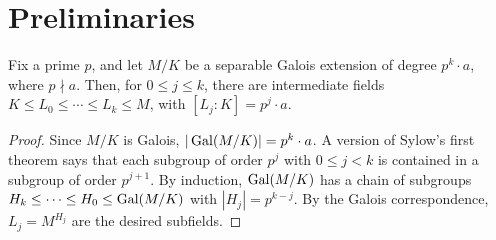 %

\section{Preliminaries}

\begin{lemma}
  \label{lem:sylow_galois}
  Fix a prime $p$, and let $M/K$ be a separable Galois extension of degree $p^k\cdot a$, where $p\nmid a$. Then, for $0\leq j\leq k$, there are intermediate fields $K\leq L_0\leq\cdots\leq L_k\leq M$, with $[L_j:K]=p^j\cdot a$.
\end{lemma}
\begin{proof}
  Since $M/K$ is Galois, $|\operatorname{Gal}(M/K)|=p^k\cdot a$. A version of Sylow's first theorem says that each subgroup of order $p^j$ with $0\leq j<k$ is contained in a subgroup of order $p^{j+1}$. By induction, $\operatorname{Gal}(M/K)$ has a chain of subgroups $H_k\leq\cdots\leq H_0\leq \operatorname{Gal}(M/K)$ with $|H_j|=p^{k-j}$. By the Galois correspondence, $L_j=M^{H_j}$ are the desired subfields.
\end{proof}


